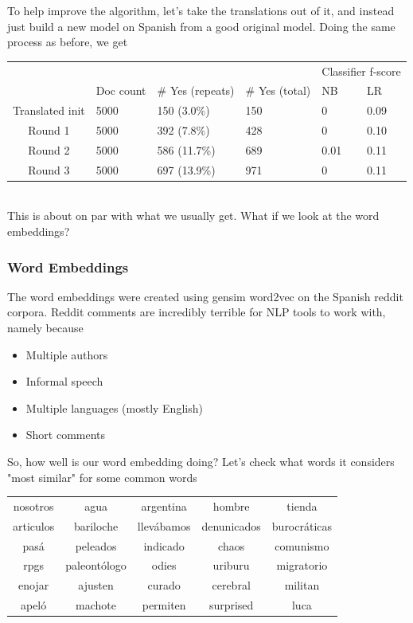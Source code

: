 \documentclass[11pt]{article} %
\begin{document}
To help improve the algorithm, let's take the translations out of it, and instead just build a new model on Spanish from a good original model. Doing the same process as before, we get \\

\begin{tabular}{|c|l|l|l|l|l|}
\rowcolor{gray!50} &&&& \multicolumn{2}{|c|}{Classifier f-score} \\
\rowcolor{gray!50} & Doc count & \# Yes (repeats) & \# Yes (total) & NB & LR \\
Translated init & 5000 & 150 (3.0\%) & 150 & 0 & 0.09 \\
Round 1 & 5000 &  392 (7.8\%) & 428 & 0 & 0.10 \\
Round 2 & 5000 & 586 (11.7\%)& 689 & 0.01 & 0.11 \\
Round 3 & 5000 & 697 (13.9\%) & 971 & 0 & 0.11
\end{tabular} \\

This is about on par with what we usually get. What if we look at the word embeddings?

\subsubsection{Word Embeddings}

The word embeddings were created using gensim word2vec on the Spanish reddit corpora. Reddit comments are incredibly terrible for NLP tools to work with, namely because
\begin{itemize}
\item Multiple authors \\
\item Informal speech \\
\item Multiple languages (mostly English) \\
\item Short comments\end{itemize}

So, how well is our word embedding doing? Let's check what words it considers "most similar" for some common words

\begin{tabular}{c|c|c|c|c}
\rowcolor{gray!50} nosotros & agua & argentina & hombre & tienda \\
articulos & bariloche & llev\'abamos & denunicados & burocr\'aticas \\ 
pas\'a & peleados & indicado & chaos & comunismo \\
rpgs & paleont\'ologo & odies & uriburu & migratorio \\
enojar & ajusten & curado & cerebral & militan \\
apel\'o & machote & permiten & surprised & luca \end{tabular}
\end{document}
